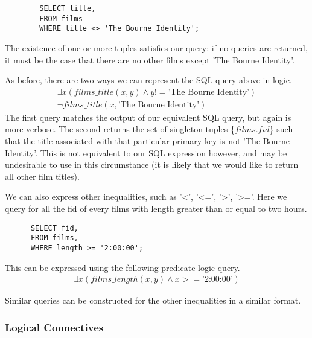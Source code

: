 \documentclass[a4paper, 11pt]{article}
\begin{document}
      \begin{verbatim}
        SELECT title,
        FROM films
        WHERE title <> 'The Bourne Identity';
      \end{verbatim}

      The existence of one or more tuples satisfies our query; if no queries
      are returned, it must be the case that there are no other films except
      'The Bourne Identity'.

      As before, there are two ways we can represent the SQL query above in
      logic.
      \begin{gather}
        \exists x(films\_title(x, y) \land y !=  \text{'The Bourne
        Identity'})\label{where3}\\
        \lnot films\_title(x, \text{'The Bourne Identity'})\label{where4}
      \end{gather}
      The first query matches the output of our equivalent SQL query, but again
      is more verbose. The second returns the set of singleton tuples
      \{$films.fid$\} such that the title associated with that particular
      primary key is not 'The Bourne Identity'. This is not equivalent to our
      SQL expression however, and may be undesirable to use in this
      circumstance (it is likely that we would like to return all other film
      titles).


      We can also express other inequalities, such as '<', '<=', '>', '>='.
      Here we query for all the fid of every films with length greater than or
      equal to two hours.

      \begin{verbatim}
      SELECT fid,
      FROM films,
      WHERE length >= '2:00:00';
      \end{verbatim}

      This can be expressed using the following predicate logic query.
      \begin{gather}
        \exists x(films\_length(x, y) \land x >= \text{'2:00:00'}) \label{where5}
      \end{gather}

      Similar queries can be constructed for the other inequalities in a
      similar format.

    \subsubsection{Logical Connectives}
\end{document}
